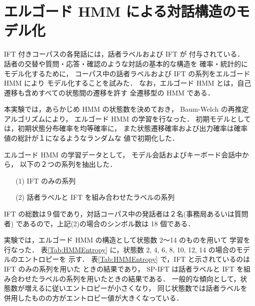 \section{エルゴード HMM による対話構造のモデル化}

IFT 付きコーパスの各発話には，話者ラベルおよび IFT が
付与されている．
話者の交替や質問・応答・確認のような対話の基本的な構造を
確率・統計的にモデル化するために，
コーパス中の話者ラベルおよび IFT の系列をエルゴード HMM により
モデル化することを試みた．
なお，エルゴード HMM とは，自己遷移も含めすべての状態間の遷移を許す
全遷移型の HMM である．

本実験では，あらかじめ HMM の状態数を決めておき，
Baum-Welch の再推定アルゴリズムにより，
エルゴード HMM の学習を行なった．
初期モデルとしては，初期状態分布確率を均等確率に，
また状態遷移確率および出力確率は確率値の総計が１になるようなランダムな
値で初期化した．

エルゴード HMM の学習データとして，
モデル会話およびキーボード会話中から，
以下の２つの系列を抽出した．
\begin{itemize}
\item[(1)]      IFT のみの系列
\item[(2)]      話者ラベルと IFT を組み合わせたラベルの系列
\end{itemize}
IFT の総数は９個であり，対話コーパス中の発話者は２名(事務局あるいは質問者)
であるので，上記(2)の場合のシンボル数は 18 個である．

実験では，エルゴード HMM の構造として状態数 2〜14 のものを用いて
学習を行なった．
表\ref{Tab:HMMEntropy} に，状態数 2, 4, 6, 8, 10, 12, 14 の場合のモデルのエントロピーを
示す．
表\ref{Tab:HMMEntropy} で，IFT と示されているのは IFT のみの系列を用いた
ときの結果であり，
SP-IFT は話者ラベルと IFT を組み合わせたラベルの系列を用いたときの結果である．
一般的な傾向として，状態数が増えるに従いエントロピーが小さくなり，
同じ状態数では話者ラベルを併用したものの方がエントロピー値が大きくなっている．

